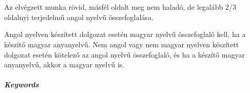\chapter*{\summary}

\selectforeignlanguage %

Az elvégzett munka rövid, másfél oldalt meg nem haladó, de legalább 2/3 
oldalnyi terjedelmű angol nyelvű összefoglalása.

Angol nyelven készített dolgozat esetén magyar nyelvű összefoglaló kell, ha a
készítő magyar anyanyelvű. Nem angol vagy nem magyar nyelven készített
dolgozat esetén kötelező az angol nyelvű összefoglaló, és ha a készítő magyar
anyanyelvű, akkor a magyar nyelvű is.

\vspace{0.5cm}
\paragraph{Keywords} \emph{\keywords}  %


\selectthesislanguage %
